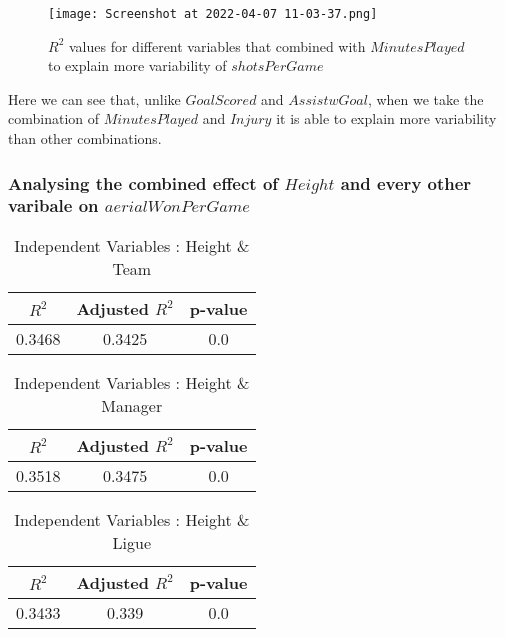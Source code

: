 \documentclass[12pt]{article}
\begin{document}
\begin{figure}[H]
	\centering
	\texttt{[image: Screenshot at 2022-04-07 11-03-37.png]}
	\caption{ $ R^2 $ values for different variables that combined with $ MinutesPlayed $ to explain more variability of $ shotsPerGame $}
	\label{fig:1}
	\label{var2SPG}
\end{figure} 

Here we can see that, unlike $ GoalScored $ and $ AssistwGoal $, when we take the combination of $ MinutesPlayed $ and $ Injury $ it is able to explain more variability than other combinations.
\newpage
\subsubsection{Analysing the combined effect of $ Height $ and every other varibale on $ aerialWonPerGame $}
\begin{minipage}{0.4\textwidth}
	\begin{table}[H]
		\centering
		\caption{Independent Variables : Height \& Team}\label{table:1a}
		{\begin{tabular}{|c|c|c|}
				\hline
				$ R^2 $ & Adjusted $ R^2 $ & p-value \\
				\hline
				0.3468 & 0.3425 & 0.0 \\
				\hline
			\end{tabular}
		}
	\end{table}
\end{minipage}
\hfill
\begin{minipage}{0.4\textwidth}
	\begin{table}[H]
		\centering
		\caption{Independent Variables : Height \& Manager}\label{table:1a}
		{\begin{tabular}{|c|c|c|}
				\hline
				$ R^2 $ & Adjusted $ R^2 $ & p-value \\
				\hline
				0.3518 & 0.3475 & 0.0 \\
				\hline
			\end{tabular}
		}
	\end{table}
\end{minipage}
\hfill
\begin{minipage}{0.4\textwidth}
	\begin{table}[H]
		\centering
		\caption{Independent Variables : Height \& Ligue}\label{table:1a}
		{\begin{tabular}{|c|c|c|}
				\hline
				$ R^2 $ & Adjusted $ R^2 $ & p-value \\
				\hline
				0.3433 & 0.339 & 0.0 \\
				\hline
			\end{tabular}
		}
	\end{table}
\end{minipage}
\end{document}
